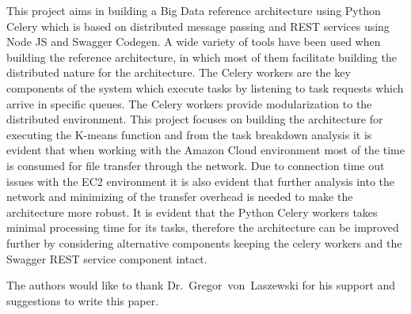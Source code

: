 This project aims in building a Big Data reference architecture using Python 
Celery which is based on distributed message passing and REST services using 
Node JS and Swagger Codegen. A wide variety of tools have been used when 
building the reference architecture, in which most of them facilitate building 
the distributed nature for the architecture. The Celery workers are the key 
components of the system which execute tasks by listening to task requests 
which arrive in specific queues. The Celery workers provide modularization to 
the distributed environment. This project focuses on building the 
architecture for executing the K-means function and from the task breakdown 
analysis it is evident that when working with the Amazon Cloud environment 
most of the time is consumed for file transfer through the network. Due to 
connection time out issues with the EC2 environment it is also evident that 
further analysis into the network and minimizing of the transfer overhead is 
needed to make the architecture more robust. It is evident that the Python 
Celery workers takes minimal processing time for its tasks, therefore the 
architecture can be improved further by considering alternative components 
keeping the celery workers and the Swagger REST service component intact.

\begin{acks}

  The authors would like to thank Dr.~Gregor~von~Laszewski for his
  support and suggestions to write this paper.

\end{acks}


 

